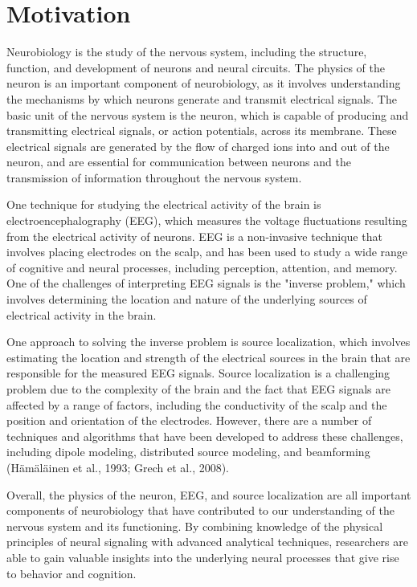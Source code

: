 \documentclass[a4paper, UKenglish, 11pt]{uiomaster}
\begin{document}
\section{Motivation}
Neurobiology is the study of the nervous system, including the structure, function, and development of neurons and neural circuits. The physics of the neuron is an important component of neurobiology, as it involves understanding the mechanisms by which neurons generate and transmit electrical signals. The basic unit of the nervous system is the neuron, which is capable of producing and transmitting electrical signals, or action potentials, across its membrane. These electrical signals are generated by the flow of charged ions into and out of the neuron, and are essential for communication between neurons and the transmission of information throughout the nervous system.

One technique for studying the electrical activity of the brain is electroencephalography (EEG), which measures the voltage fluctuations resulting from the electrical activity of neurons. EEG is a non-invasive technique that involves placing electrodes on the scalp, and has been used to study a wide range of cognitive and neural processes, including perception, attention, and memory. One of the challenges of interpreting EEG signals is the "inverse problem," which involves determining the location and nature of the underlying sources of electrical activity in the brain.

One approach to solving the inverse problem is source localization, which involves estimating the location and strength of the electrical sources in the brain that are responsible for the measured EEG signals. Source localization is a challenging problem due to the complexity of the brain and the fact that EEG signals are affected by a range of factors, including the conductivity of the scalp and the position and orientation of the electrodes. However, there are a number of techniques and algorithms that have been developed to address these challenges, including dipole modeling, distributed source modeling, and beamforming (Hämäläinen et al., 1993; Grech et al., 2008).

Overall, the physics of the neuron, EEG, and source localization are all important components of neurobiology that have contributed to our understanding of the nervous system and its functioning. By combining knowledge of the physical principles of neural signaling with advanced analytical techniques, researchers are able to gain valuable insights into the underlying neural processes that give rise to behavior and cognition.
\end{document}
